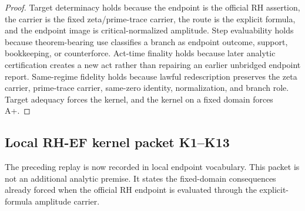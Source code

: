 \documentclass[11pt]{article}
\begin{document}
\begin{proof}
Target determinacy holds because the endpoint is the official RH assertion, the carrier is the fixed zeta/prime-trace carrier, the route is the explicit formula, and the endpoint image is critical-normalized amplitude.  Step evaluability holds because theorem-bearing use classifies a branch as endpoint outcome, support, bookkeeping, or counterforce.  Act-time finality holds because later analytic certification creates a new act rather than repairing an earlier unbridged endpoint report.  Same-regime fidelity holds because lawful redescription preserves the zeta carrier, prime-trace carrier, same-zero identity, normalization, and branch role.  Target adequacy forces the kernel, and the kernel on a fixed domain forces A+.
\end{proof}


\subsection{Local RH-EF kernel packet K1--K13}

The preceding replay is now recorded in local endpoint vocabulary.  This packet is not an additional analytic premise.  It states the fixed-domain consequences already forced when the official RH endpoint is evaluated through the explicit-formula amplitude carrier.
\end{document}
